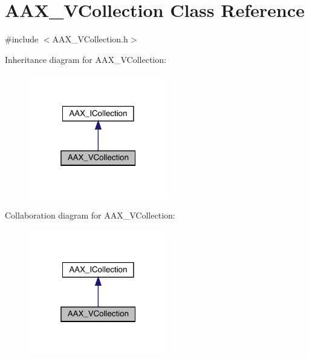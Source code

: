 \hypertarget{a01897}{}\section{A\+A\+X\+\_\+\+V\+Collection Class Reference}
\label{a01897}


{\ttfamily \#include $<$A\+A\+X\+\_\+\+V\+Collection.\+h$>$}



Inheritance diagram for A\+A\+X\+\_\+\+V\+Collection\+:
\nopagebreak
\begin{figure}[H]
\begin{center}
\leavevmode
\includegraphics[width=172pt]{a01896}
\end{center}
\end{figure}


Collaboration diagram for A\+A\+X\+\_\+\+V\+Collection\+:
\nopagebreak
\begin{figure}[H]
\begin{center}
\leavevmode
\includegraphics[width=172pt]{a01895}
\end{center}
\end{figure}


